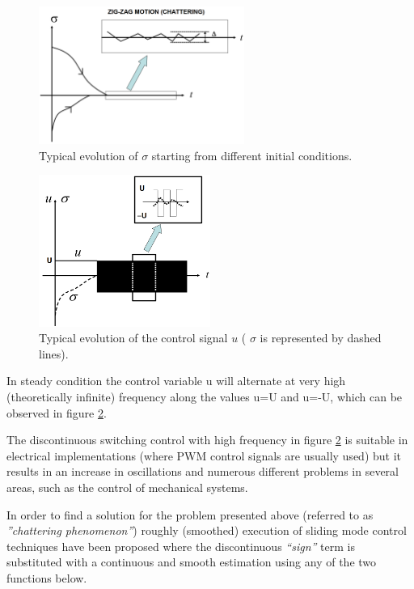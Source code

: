 \documentclass{thesisreport}
\begin{document}
\begin{figure}[h]
\centering
\includegraphics[width=0.6\textwidth]{Images/Control/first_order_sliding_mode_control}
\caption{Typical evolution of $\sigma$ starting from different initial conditions. \cite{DeCarlo2008}}
\label{sigma_evolution}
\end{figure}

\newpage

\begin{figure}[h]
\centering
\includegraphics[width=0.5\textwidth]{Images/Control/first_order_sliding_mode_control_b}
\caption{Typical evolution of the control signal $u$ ( $\sigma$ is represented by dashed lines). \cite{DeCarlo2008}}
\label{control_evolution}
\end{figure}


\noindent In steady condition the control variable u will alternate at very high (theoretically infinite) frequency along the values u=U
and u=-U, which can be observed in figure \ref{control_evolution}.



\noindent The discontinuous switching control with high frequency  in figure \ref{control_evolution} is suitable in electrical implementations (where PWM control signals are usually used) but it results in an increase in oscillations and numerous different problems in several areas, such as the control of mechanical systems.


In order to find a solution for the problem presented above (referred to as \textit{”chattering phenomenon”}) roughly (smoothed) execution of sliding mode control techniques have been proposed where the discontinuous \textit{“sign”} term is substituted with a  continuous and smooth estimation using any of the two functions below.
\end{document}
